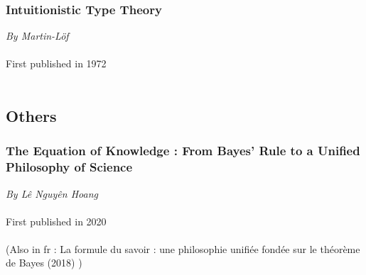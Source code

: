 \documentclass{article}
\begin{document}
\subsubsection{Intuitionistic Type Theory}
\textit{By Martin-Löf}\\\\
First published in 1972\\\\
\subsection{Others}
\subsubsection{The Equation of Knowledge : From Bayes' Rule to a Unified Philosophy of Science}
\textit{By Lê Nguyên Hoang}\\\\
First published in 2020\\\\
(Also in fr : La formule du savoir : une philosophie unifiée fondée sur le théorème de Bayes (2018) )\\\\
\end{document}
